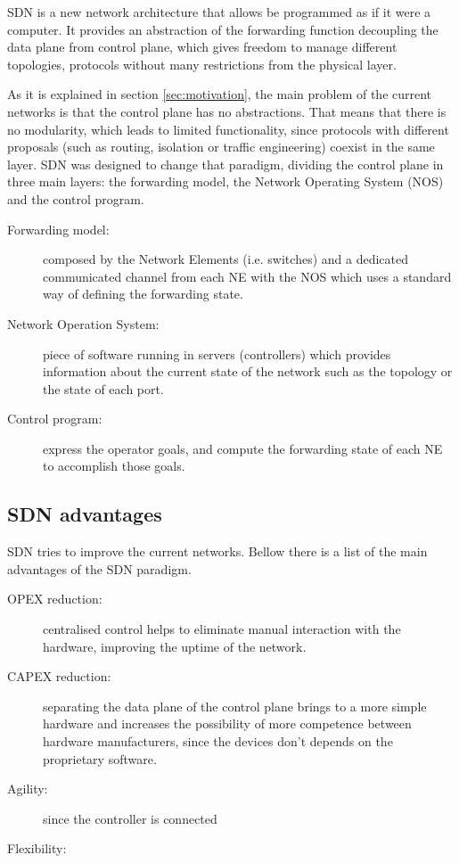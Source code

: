 SDN is a new network architecture that allows be programmed as if it were a computer. It provides an abstraction of the forwarding function decoupling the data plane from control plane, which gives freedom to manage different topologies, protocols without many restrictions from the physical layer.

As it is explained in section \ref{sec:motivation}, the main problem of the current networks is that the control plane has no abstractions. That means that there is no modularity, which leads to limited functionality, since protocols with different proposals (such as routing, isolation or traffic engineering) coexist in the same layer. SDN was designed to change that paradigm, dividing the control plane in three main layers: the forwarding model, the Network Operating System (NOS) and the control program.

\begin{description}
\item[Forwarding model:] composed by the Network Elements (i.e. switches) and a dedicated communicated channel from each NE with the NOS which uses a standard way of defining the forwarding state.  
\item[Network Operation System:] piece of software running in servers (controllers) which provides information about the current state of the network such as the topology or the state of each port. 
\item[Control program:] express the operator goals, and compute the forwarding state of each NE to accomplish those goals.
\end{description}





\subsection{SDN advantages} 

SDN tries to improve the current networks. Bellow there is a list of the main advantages of the SDN paradigm.

\begin{description}
\item[OPEX reduction:] centralised control helps to eliminate manual interaction with the hardware, improving the uptime of the network. 
\item[CAPEX reduction:] separating the data plane of the control plane brings to a more simple hardware and increases the possibility of more competence between hardware manufacturers, since the devices don't depends on the proprietary software.
\item[Agility:] since the controller is connected
\item[Flexibility:]
\end{description}



